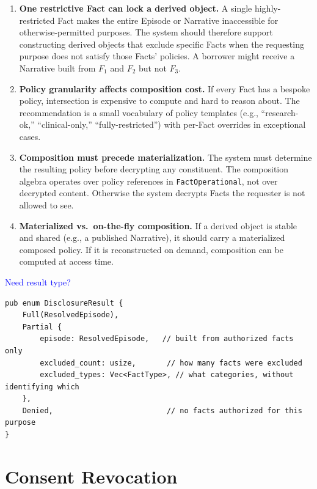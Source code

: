 \documentclass[11pt]{article}
\begin{document}
\begin{enumerate}

\item \textbf{One restrictive Fact can lock a derived object.} A single
  highly-restricted Fact makes the entire Episode or Narrative
  inaccessible for otherwise-permitted purposes. The system should
  therefore support constructing derived objects that exclude specific
  Facts when the requesting purpose does not satisfy those Facts'
  policies. A borrower might receive a Narrative built from $F_1$ and
  $F_2$ but not $F_3$.

\item \textbf{Policy granularity affects composition cost.} If every
  Fact has a bespoke policy, intersection is expensive to compute and
  hard to reason about. The recommendation is a small vocabulary of
  policy templates (e.g., ``research-ok,'' ``clinical-only,''
  ``fully-restricted'') with per-Fact overrides in exceptional cases.

\item \textbf{Composition must precede materialization.} The system must
  determine the resulting policy before decrypting any constituent. The
  composition algebra operates over policy references in
  \texttt{FactOperational}, not over decrypted content. Otherwise the
  system decrypts Facts the requester is not allowed to see.

\item \textbf{Materialized vs.\ on-the-fly composition.} If a derived
  object is stable and shared (e.g., a published Narrative), it should
  carry a materialized composed policy. If it is reconstructed on
  demand, composition can be computed at access time.

\end{enumerate}

\textcolor{blue}{Need result type?}

\begin{verbatim}
pub enum DisclosureResult {
    Full(ResolvedEpisode),
    Partial {
        episode: ResolvedEpisode,   // built from authorized facts only
        excluded_count: usize,       // how many facts were excluded
        excluded_types: Vec<FactType>, // what categories, without identifying which
    },
    Denied,                          // no facts authorized for this purpose
}
\end{verbatim}

\section{Consent Revocation}
\label{sec:revocation}
\end{document}
